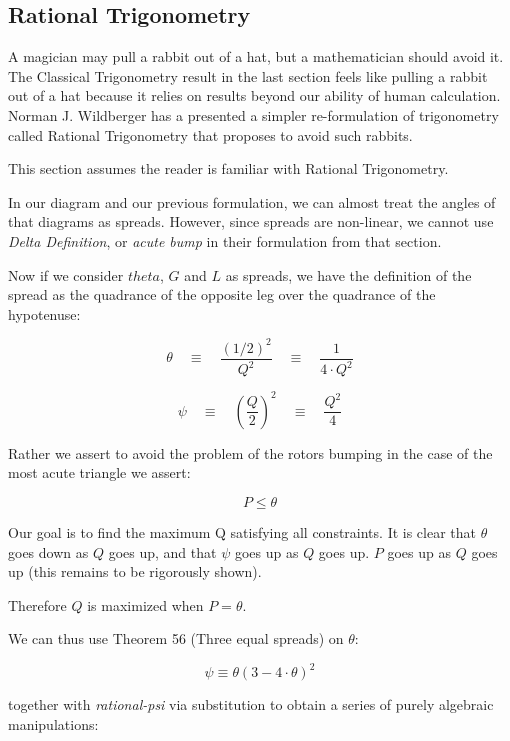 \documentclass[11pt]{article}
\begin{document}
\label{rationalphiproof}

\subsection{Rational Trigonometry}

A magician may pull a rabbit out of a hat, but a mathematician should avoid it.
The Classical Trigonometry result in the last section feels like pulling a rabbit out of a hat because it relies
on results beyond our ability of human calculation.  Norman J. Wildberger has a presented a simpler re-formulation
of trigonometry called Rational Trigonometry\cite{wildberger2005} that proposes to avoid such rabbits.

This section assumes the reader is familiar with Rational Trigonometry.

In our diagram and our previous formulation, we can almost treat the angles of that diagrams as spreads. However,
since spreads are non-linear, we cannot use \textit{Delta Definition},  or \textit{acute bump} in their
formulation from that section.


Now if we consider $theta$, $G$ and $L$ as spreads, we have the definition of the spread as the quadrance of the
opposite leg over the quadrance of the hypotenuse:


\[ \tag{rational-theta} \theta \quad \equiv \quad \frac{(1/2)^2}{Q^2} \quad \equiv \quad \frac{1}{4 \cdot Q^2}  \]

\[ \tag{rational-psi} \psi \quad \equiv \quad (\frac{Q}{2})^2 \quad \equiv \quad \frac{Q^2}{4}  \]


Rather we assert to avoid the problem of the rotors bumping in the case of the most acute triangle we assert:

\[ \tag{rational acute bump} P \leq \theta  \]

Our goal is to find the maximum Q satisfying all constraints.  It is clear that $\theta$ goes down as $Q$ goes
up, and that $\psi$ goes up as $Q$ goes up.  $P$ goes up as $Q$ goes up (this remains to be rigorously shown).

Therefore $Q$ is maximized when $P = \theta$.

We can thus use Theorem 56 (Three equal spreads) \cite{wildberger2005} on $\theta$:

\[  \psi \equiv \theta (3 - 4 \cdot \theta)^2  \]

together with \textit{rational-psi} via substitution to obtain a series of purely algebraic manipulations:
\end{document}

